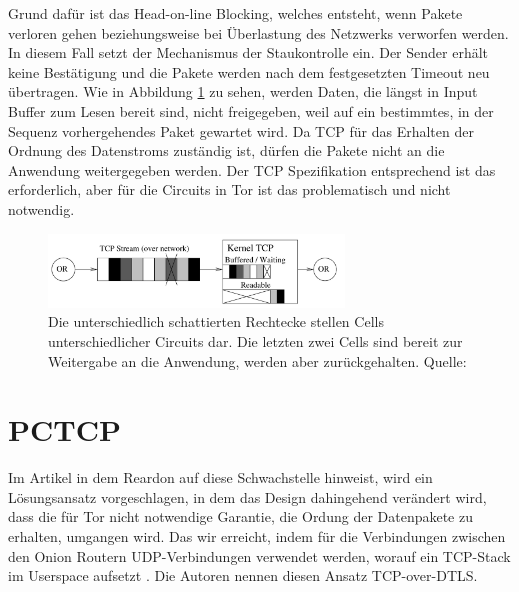 \documentclass[fleqn,envcountsame,runningheads,10pt,a4paper]{llncs}
\begin{document}
Grund dafür ist das Head-on-line Blocking, welches entsteht, wenn Pakete 
verloren gehen beziehungsweise bei Überlastung des Netzwerks verworfen werden. 
In diesem Fall setzt der Mechanismus der Staukontrolle ein. Der Sender erhält 
keine Bestätigung und die Pakete werden nach dem festgesetzten Timeout neu 
übertragen. Wie in Abbildung \ref{fig:headonline} zu sehen, werden Daten, die 
längst in Input Buffer zum Lesen bereit sind, nicht freigegeben, weil auf ein 
bestimmtes, in der Sequenz vorhergehendes Paket gewartet wird. Da TCP für das 
Erhalten der Ordnung des Datenstroms zuständig ist, dürfen die Pakete nicht an 
die Anwendung weitergegeben werden. Der TCP Spezifikation entsprechend ist das 
erforderlich, aber für die Circuits in Tor ist das problematisch und nicht 
notwendig.

\begin{figure}[h]
  \begin{center}
    \includegraphics[width=0.7\textwidth]{pics/headonlinevanilla.pdf}
    \caption{Die unterschiedlich schattierten Rechtecke stellen Cells unterschiedlicher Circuits dar. Die letzten zwei Cells sind bereit zur Weitergabe an die Anwendung, werden aber zurückgehalten. Quelle: \cite{tcp-over-dtls}}
    \label{fig:headonline} 
  \end{center} 
\end{figure}

\section{PCTCP}\label{sec:pctcp}

Im Artikel in dem Reardon auf diese Schwachstelle hinweist, wird ein 
Lösungsansatz vorgeschlagen, in dem das Design dahingehend verändert wird, dass 
die für Tor nicht notwendige Garantie, die Ordung der Datenpakete zu erhalten, 
umgangen wird. Das wir erreicht, indem für die Verbindungen zwischen den Onion 
Routern UDP-Verbindungen verwendet werden, worauf ein TCP-Stack im Userspace 
aufsetzt \cite{tcp-over-dtls}. Die Autoren nennen diesen Ansatz TCP-over-DTLS.
\end{document}
